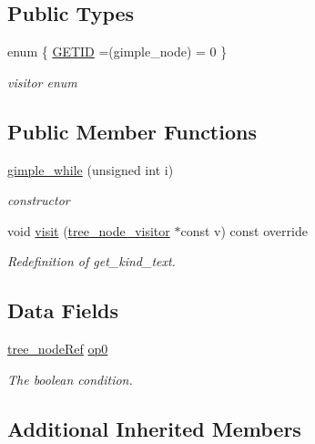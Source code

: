 \subsection*{Public Types}
\begin{DoxyCompactItemize}
\item 
enum \{ \hyperlink{structgimple__while_ae79425448cd553a37f2ce72f324bceeba0289db4fdfcc2857f52829764cef2f04}{G\+E\+T\+ID} =(gimple\+\_\+node) = 0
 \}\begin{DoxyCompactList}\small\item\em visitor enum \end{DoxyCompactList}
\end{DoxyCompactItemize}
\subsection*{Public Member Functions}
\begin{DoxyCompactItemize}
\item 
\hyperlink{structgimple__while_a99fb6e775f0131a45752665eb25f0506}{gimple\+\_\+while} (unsigned int i)
\begin{DoxyCompactList}\small\item\em constructor \end{DoxyCompactList}\item 
void \hyperlink{structgimple__while_a8fbe7b677d626e16026d600db417ef32}{visit} (\hyperlink{classtree__node__visitor}{tree\+\_\+node\+\_\+visitor} $\ast$const v) const override
\begin{DoxyCompactList}\small\item\em Redefinition of get\+\_\+kind\+\_\+text. \end{DoxyCompactList}\end{DoxyCompactItemize}
\subsection*{Data Fields}
\begin{DoxyCompactItemize}
\item 
\hyperlink{tree__node_8hpp_a6ee377554d1c4871ad66a337eaa67fd5}{tree\+\_\+node\+Ref} \hyperlink{structgimple__while_a1eb1e3913ad0bc24b6927c81cdef4be2}{op0}
\begin{DoxyCompactList}\small\item\em The boolean condition. \end{DoxyCompactList}\end{DoxyCompactItemize}
\subsection*{Additional Inherited Members}


